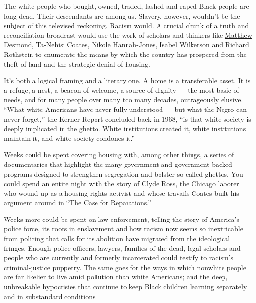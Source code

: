 The white people who bought, owned, traded, lashed and raped Black
people are long dead. Their descendants are among us. Slavery, however,
wouldn't be the subject of this televised reckoning. Racism would. A
crucial chunk of a truth and reconciliation broadcast would use the work
of scholars and thinkers like
\href{https://www.nytimes3xbfgragh.onion/2016/02/22/books/evicted-book-review-matthew-desmond.html}{Matthew
Desmond}, Ta-Nehisi Coates,
\href{https://www.nytimes3xbfgragh.onion/interactive/2020/06/24/magazine/reparations-slavery.html}{Nikole
Hannah-Jones}, Isabel Wilkerson and Richard Rothstein to enumerate the
means by which the country has prospered from the theft of land and the
strategic denial of housing.

It's both a logical framing and a literary one. A home is a transferable
asset. It is a refuge, a nest, a beacon of welcome, a source of dignity
--- the most basic of needs, and for many people over many too many
decades, outrageously elusive. ``What white Americans have never fully
understood --- but what the Negro can never forget,'' the Kerner Report
concluded back in 1968, ``is that white society is deeply implicated in
the ghetto. White institutions created it, white institutions maintain
it, and white society condones it.''

Weeks could be spent covering housing with, among other things, a series
of documentaries that highlight the many government and
government-backed programs designed to strengthen segregation and
bolster so-called ghettos. You could spend an entire night with the
story of Clyde Ross, the Chicago laborer who wound up as a housing
rights activist and whose travails Coates built his argument around in
``\href{https://www.theatlantic.com/magazine/archive/2014/06/the-case-for-reparations/361631/}{The
Case for Reparations}.''

Weeks more could be spent on law enforcement, telling the story of
America's police force, its roots in enslavement and how racism now
seems so inextricable from policing that calls for its abolition have
migrated from the ideological fringes. Enough police officers, lawyers,
families of the dead, legal scholars and people who are currently and
formerly incarcerated could testify to racism's criminal-justice
puppetry. The same goes for the ways in which nonwhite people are far
likelier to
\href{https://www.theatlantic.com/politics/archive/2018/02/the-trump-administration-finds-that-environmental-racism-is-real/554315/}{live
amid pollution} than white Americans; and the deep, unbreakable
hypocrisies that continue to keep Black children learning separately and
in substandard conditions.


